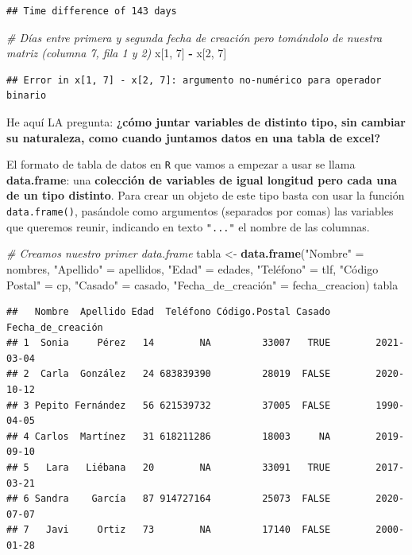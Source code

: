 \documentclass[11pt,]{book}
\newenvironment{Shaded}{\begin{snugshade}}{\end{snugshade}}
\newcommand{\CommentTok}[1]{\textcolor[rgb]{0.37,0.37,0.37}{\textit{#1}}}
\newcommand{\DecValTok}[1]{\textcolor[rgb]{0.06,0.06,0.06}{#1}}
\newcommand{\KeywordTok}[1]{\textcolor[rgb]{0.27,0.27,0.27}{\textbf{#1}}}
\newcommand{\NormalTok}[1]{#1}
\newcommand{\OperatorTok}[1]{\textcolor[rgb]{0.43,0.43,0.43}{\textbf{#1}}}
\newcommand{\StringTok}[1]{\textcolor[rgb]{0.5,0.5,0.5}{#1}}
\begin{document}
\begin{verbatim}
## Time difference of 143 days
\end{verbatim}

\begin{Shaded}
\begin{Highlighting}[]
\CommentTok{# Días entre primera y segunda fecha de creación pero tomándolo de nuestra matriz (columna 7, fila 1 y 2)}
\NormalTok{x[}\DecValTok{1}\NormalTok{, }\DecValTok{7}\NormalTok{] }\OperatorTok{-}\StringTok{ }\NormalTok{x[}\DecValTok{2}\NormalTok{, }\DecValTok{7}\NormalTok{]}
\end{Highlighting}
\end{Shaded}

\begin{verbatim}
## Error in x[1, 7] - x[2, 7]: argumento no-numérico para operador binario
\end{verbatim}

He aquí LA pregunta: \textbf{¿cómo juntar variables de distinto tipo, sin cambiar su naturaleza, como cuando juntamos datos en una tabla de excel?}

El formato de tabla de datos en \texttt{R} que vamos a empezar a usar se llama \textbf{data.frame}: una \textbf{colección de variables de igual longitud pero cada una de un tipo distinto}. Para crear un objeto de este tipo basta con usar la función \texttt{data.frame()}, pasándole como argumentos (separados por comas) las variables que queremos reunir, indicando en texto \texttt{"..."} el nombre de las columnas.

\begin{Shaded}
\begin{Highlighting}[]
\CommentTok{# Creamos nuestro primer data.frame}
\NormalTok{tabla <-}\StringTok{ }\KeywordTok{data.frame}\NormalTok{(}\StringTok{"Nombre"}\NormalTok{ =}\StringTok{ }\NormalTok{nombres, }\StringTok{"Apellido"}\NormalTok{ =}\StringTok{ }\NormalTok{apellidos,}
                    \StringTok{"Edad"}\NormalTok{ =}\StringTok{ }\NormalTok{edades, }\StringTok{"Teléfono"}\NormalTok{ =}\StringTok{ }\NormalTok{tlf,}
                    \StringTok{"Código Postal"}\NormalTok{ =}\StringTok{ }\NormalTok{cp, }\StringTok{"Casado"}\NormalTok{ =}\StringTok{ }\NormalTok{casado,}
                    \StringTok{"Fecha_de_creación" = fecha_creacion)}
\StringTok{tabla}
\end{Highlighting}
\end{Shaded}

\begin{verbatim}
##   Nombre  Apellido Edad  Teléfono Código.Postal Casado Fecha_de_creación
## 1  Sonia     Pérez   14        NA         33007   TRUE        2021-03-04
## 2  Carla  González   24 683839390         28019  FALSE        2020-10-12
## 3 Pepito Fernández   56 621539732         37005  FALSE        1990-04-05
## 4 Carlos  Martínez   31 618211286         18003     NA        2019-09-10
## 5   Lara   Liébana   20        NA         33091   TRUE        2017-03-21
## 6 Sandra    García   87 914727164         25073  FALSE        2020-07-07
## 7   Javi     Ortiz   73        NA         17140  FALSE        2000-01-28
\end{verbatim}
\end{document}
